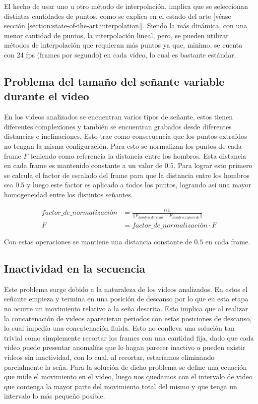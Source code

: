 El hecho de usar uno u otro método de interpolación, implica que se seleccionan distintas cantidades de puntos, como se explica en el estado del arte [véase sección \ref{section:state-of-the-art:interpolation}]. Siendo la más dinámica, con una menor cantidad de puntos, la interpolación lineal, pero, se pueden utilizar métodos de interpolación que requieran más puntos ya que, mínimo, se cuenta con 24 fps (frames por segundo) en cada vídeo, lo cual es bastante estándar.


\subsection{Problema del tamaño del señante variable durante el video}

En los videos analizados se encuentran varios tipos de señante, estos tienen diferentes complexiones y también
se encuentran grabados desde diferentes distancias e inclinaciones. Esto trae como consecuencia que los puntos 
extraídos no tengan la misma configuración. Para esto se normalizan los puntos de cada frame $F$ teniendo como 
referencia la distancia entre los hombros. Esta distancia en cada frame es mantenido constante a un valor de $0.5$. Para lograr esto 
primero se calcula el factor de escalado del frame para que la distancia entre los hombros sea $0.5$ y luego este 
factor es aplicado a todos los puntos, logrando así una mayor homogeneidad entre los distintos señantes.

\begin{align}
factor\_de\_normalización &= \frac{0.5}{|| F_{hombro\_derecho} - F_{hombro\_izquierdo} ||} \\
F &= factor\_de\_normalización \cdot F
\end{align}

Con estas operaciones se mantiene una distancia constante de $0.5$ en cada frame.


\subsection{Inactividad en la secuencia}
Este problema surge debido a la naturaleza de los videos analizados. En estos el señante empieza y termina en una 
posición de descanso por lo que en esta etapa no ocurre un movimiento relativo a la seña descrita. Esto implica 
que al realizar la concatenación de videos aparecieran periodos con estas posiciones de descanso, lo cual impedía
una concatenación fluida. Esto no conlleva una solución tan trivial como simplemente recortar los frames con una cantidad fija, dado que cada video puede presentar anomalías que lo hagan parecer inactivo o pueden existir videos sin inactividad, con lo cual, al recortar, estaríamos eliminando parcialmente la seña. Para la solución de dicho problema se define una ecuación que mide el movimiento
en el video, luego nos quedamos con el intervalo de video que contenga la mayor parte del movimiento 
total del mismo y que tenga un intervalo lo más pequeño posible.

